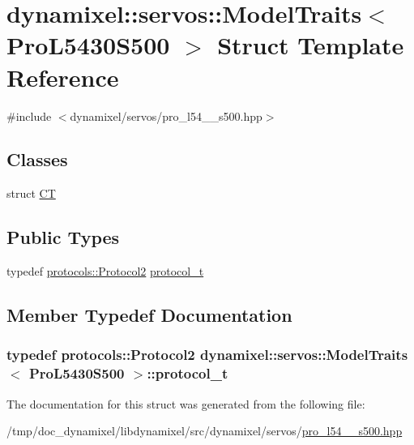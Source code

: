 \hypertarget{structdynamixel_1_1servos_1_1_model_traits_3_01_pro_l5430_s500_01_4}{}\section{dynamixel\+:\+:servos\+:\+:Model\+Traits$<$ Pro\+L5430\+S500 $>$ Struct Template Reference}
\label{structdynamixel_1_1servos_1_1_model_traits_3_01_pro_l5430_s500_01_4}


{\ttfamily \#include $<$dynamixel/servos/pro\+\_\+l54\+\_\+\_\+s500.\+hpp$>$}

\subsection*{Classes}
\begin{DoxyCompactItemize}
\item 
struct \hyperlink{structdynamixel_1_1servos_1_1_model_traits_3_01_pro_l5430_s500_01_4_1_1_c_t}{C\+T}
\end{DoxyCompactItemize}
\subsection*{Public Types}
\begin{DoxyCompactItemize}
\item 
typedef \hyperlink{classdynamixel_1_1protocols_1_1_protocol2}{protocols\+::\+Protocol2} \hyperlink{structdynamixel_1_1servos_1_1_model_traits_3_01_pro_l5430_s500_01_4_a3fe3592ead71f8eb670ca7ea30b84d56}{protocol\+\_\+t}
\end{DoxyCompactItemize}


\subsection{Member Typedef Documentation}
\hypertarget{structdynamixel_1_1servos_1_1_model_traits_3_01_pro_l5430_s500_01_4_a3fe3592ead71f8eb670ca7ea30b84d56}{}
\subsubsection[{protocol\+\_\+t}]{\setlength{\rightskip}{0pt plus 5cm}typedef {\bf protocols\+::\+Protocol2} {\bf dynamixel\+::servos\+::\+Model\+Traits}$<$ {\bf Pro\+L5430\+S500} $>$\+::{\bf protocol\+\_\+t}}\label{structdynamixel_1_1servos_1_1_model_traits_3_01_pro_l5430_s500_01_4_a3fe3592ead71f8eb670ca7ea30b84d56}


The documentation for this struct was generated from the following file\+:\begin{DoxyCompactItemize}
\item 
/tmp/doc\+\_\+dynamixel/libdynamixel/src/dynamixel/servos/\hyperlink{pro__l54__30__s500_8hpp}{pro\+\_\+l54\+\_\+\_\+s500.\+hpp}\end{DoxyCompactItemize}
